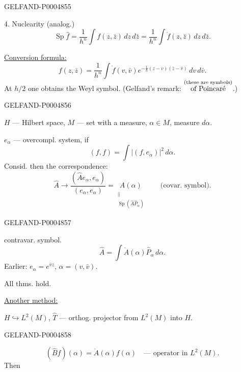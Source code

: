 \begin{GelfandAdjacentEvidence}{GELFAND-P000485}{5}


4. Nuclearity (analog.)
\[
\operatorname{Sp}\hat f
 =\frac1{h^n}\int f(z,\bar z)\,dz\,d\bar z
 =\frac1{h^n}\int\mathring f(z,\bar z)\,dz\,d\bar z.
\]

\uline{Conversion formula:}
\[
f(z,\bar z)=\frac1{h^n}\int\mathring f(v,\bar v)
 e^{-\frac1h(z-v)(\bar z-\bar v)}\,dv\,d\bar v.
\]
At $h/2$ one obtains the Weyl symbol.
(Gelfand’s remark:
$\overset{\text{\scriptsize (these are symbols)}}{\text{of Poincaré}}$.)
\end{GelfandAdjacentEvidence}
\begin{GelfandAdjacentEvidence}{GELFAND-P000485}{6}



$H$ — Hilbert space, $M$ — set with a measure, $\alpha\in M$, measure $d\alpha$.

$e_\alpha$ — overcompl. system, if
\[
(f,f)=\int |(f,e_\alpha)|^2\,d\alpha.
\]
Consid. then the correspondence:
\[
\hat A\longrightarrow\frac{(\hat A e_\alpha,e_\alpha)}{(e_\alpha,e_\alpha)}
 =\underset{\substack{\vert\!\vert\\\operatorname{Sp}(\hat A\hat P_\alpha)}}{A(\alpha)}
 \qquad\text{(covar. symbol)}.
\]
\end{GelfandAdjacentEvidence}
\begin{GelfandAdjacentEvidence}{GELFAND-P000485}{7}


contravar. symbol.
\[
\hat A=\int\mathring A(\alpha)\hat P_\alpha\,d\alpha.
\]
Earlier: $e_\alpha=e^{\bar v z}$, $\alpha=(v,\bar v)$.

All thms. hold.

\uline{Another method:}

$H\hookrightarrow L^2(M)$, $\hat T$ — orthog. projector from $L^2(M)$ into $H$.
\end{GelfandAdjacentEvidence}
\begin{GelfandAdjacentEvidence}{GELFAND-P000485}{8}

\[
(\hat Bf)(\alpha)=\mathring A(\alpha)f(\alpha)
\quad\text{— operator in }L^2(M).
\]
Then
\begingroup\color{black}\endgroup
{}
\end{GelfandAdjacentEvidence}



